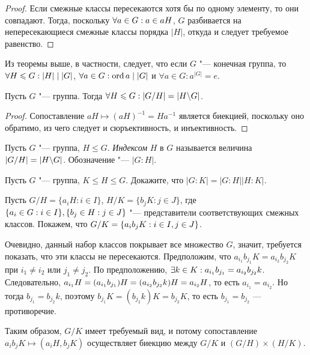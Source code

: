 \begin{proof}
	Если смежные классы пересекаются хотя бы по одному элементу, то они совпадают. Тогда, поскольку $\forall a \in G: a \hm\in aH$, $G$ разбивается на непересекающиеся смежные классы порядка $|H|$, откуда и следует требуемое равенство.
\end{proof}

\begin{reminder}
	Из теоремы выше, в частности, следует, что если $G$ "--- конечная группа, то $\forall H \hm\le G: |H| \mid |G|$, $\forall a \in G: \operatorname{ord}{a} \mid |G|$ и $\forall a \in G: a^{|G|} = e$.
\end{reminder}

\begin{proposition}
	Пусть $G$ "--- группа. Тогда $\forall H \le G: |G / H| \hm= |H \bs G|$.
\end{proposition}

\begin{proof}
	Сопоставление $aH \mapsto (aH)^{-1} = Ha^{-1}$ является биекцией, поскольку оно обратимо, из чего следует и сюръективность, и инъективность.
\end{proof}

\begin{definition}
	Пусть $G$ "--- группа, $H \le G$. \textit{Индексом} $H$ в $G$ называется величина $|G / H| = |H \backslash G|$. Обозначение "--- $|G : H|$.
\end{definition}

\begin{exercise}
	Пусть $G$ "--- группа, $K \le H \le G$. Докажите, что $|G : K| = |G : H||H : K|$.
\end{exercise}

\begin{solution}
	Пусть $G / H = \{a_iH: i \in I\}$, $H / K = \{b_jK: j \in J\}$, где $\{a_i \in G: i \in I\}, \{b_j \hm\in H: j \in J\}$ "--- представители соответствующих смежных классов. Покажем, что $G / K \hm= \{a_ib_jK : i \in I, j \in J\}$.
	
	Очевидно, данный набор классов покрывает все множество $G$, значит, требуется показать, что эти классы не пересекаются. Предположим, что $a_{i_1}b_{j_1}K = a_{i_2}b_{j_2}K$ при $i_1 \ne i_2$ или $j_1 \ne j_2$. По предположению, $\exists k \in K: a_{i_1}b_{j_1} \hm= a_{i_2}b_{j_2}k$. Следовательно, $a_{i_1}H = (a_{i_1}b_{j_1})H \hm= (a_{i_2}b_{j_2}k)H = a_{i_2}H$, то есть $a_{i_1} = a_{i_2}$. Но тогда $b_{j_1} = b_{j_2}k$, поэтому $b_{j_1}K = (b_{j_2}k)K = b_{j_2}K$, то есть $b_{j_1} = b_{j_2}$ --- противоречие.
	
	Таким образом, $G / K$ имеет требуемый вид, и потому сопоставление $a_ib_jK \mapsto (a_iH, b_jK)$ осуществляет биекцию между $G / K$ и $(G / H) \times (H / K)$.
\end{solution}

